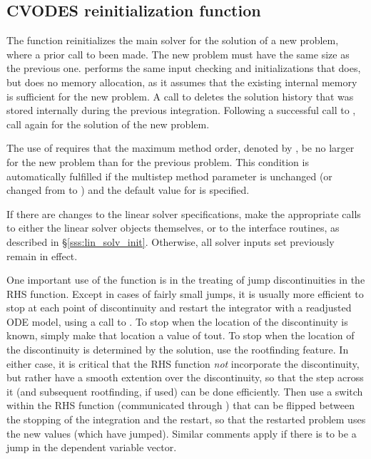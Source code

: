 \subsection{CVODES reinitialization function}\label{sss:cvreinit}

The function  reinitializes the main {\cvodes} solver for
the solution of a new problem, where a prior call to 
been made. The new problem must have the same size as the previous one.
 performs the same input checking and initializations
that  does, but does no memory allocation, as it assumes that the
existing internal memory is sufficient for the new problem.
A call to  deletes the solution history that was stored
internally during the previous integration.  Following a successful call to
, call  again for the solution of the new problem.

The use of  requires that the maximum method order, denoted by
, be no larger for the new problem than for the previous problem.
This condition is
automatically fulfilled if the multistep method parameter 
is unchanged (or changed from  to ) and the default
value for  is specified.

If there are changes to the linear solver specifications, make the
appropriate calls to either the linear solver objects themselves, or
to the {\cvls} interface routines, as described in
\S\ref{sss:lin_solv_init}.  Otherwise, all solver inputs set
previously remain in effect.

One important use of the  function is in the treating
of jump discontinuities in the RHS function.  Except in cases of
fairly small jumps, it is usually more efficient to stop at each point
of discontinuity and restart the integrator with a readjusted ODE
model, using a call to .  To stop when the location of
the discontinuity is known, simply make that location a value of tout.
To stop when the location of the discontinuity is determined by the
solution, use the rootfinding feature.  In either case, it is critical
that the RHS function {\it not} incorporate the discontinuity, but
rather have a smooth extention over the discontinuity, so that the
step across it (and subsequent rootfinding, if used) can be done
efficiently.  Then use a switch within the RHS function (communicated
through ) that can be flipped between the stopping of
the integration and the restart, so that the restarted problem uses
the new values (which have jumped).  Similar comments apply if there
is to be a jump in the dependent variable vector.


